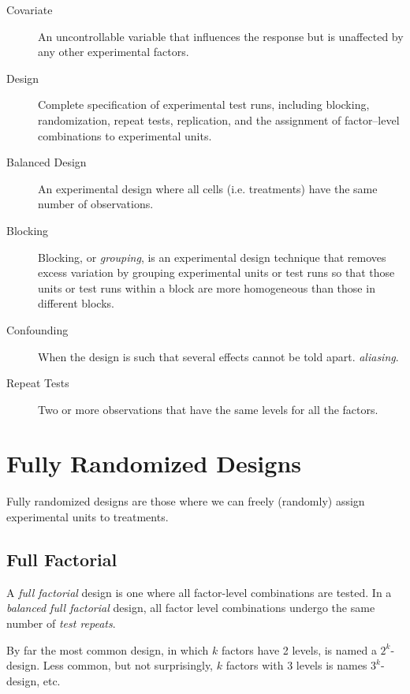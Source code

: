\begin{description}
\item [Covariate]  An uncontrollable variable that influences the response but is
unaffected by any other experimental factors.

\item [Design]  Complete specification of experimental test runs, including blocking, randomization, repeat tests, replication, and the assignment of factor–level combinations to experimental units.

\item [Balanced Design] An experimental design where all cells (i.e. treatments) have the same number of observations.

\item [Blocking]  Blocking, or \emph{grouping}, is an experimental design technique that removes excess variation by grouping experimental units or test runs so that those units or test runs within a block are more homogeneous than those in different blocks.

\item [Confounding] When the design is such that several effects cannot be told apart. \Aka \emph{aliasing}.

\item [Repeat Tests] Two or more observations that have the same levels for all the factors.

\end{description}







\section{Fully Randomized Designs}
Fully randomized designs are those where we can freely (randomly) assign experimental units to treatments.


\subsection{Full Factorial}
A \emph{full factorial} design is one where all factor-level combinations are tested.
In a \emph{balanced full factorial} design, all factor level combinations undergo the same number of \emph{test repeats}.

By far the most common design, in which $k$ factors have 2 levels, is named a $2^k$-design.
Less common, but not surprisingly, $k$ factors with 3 levels is names $3^k$-design, etc.




